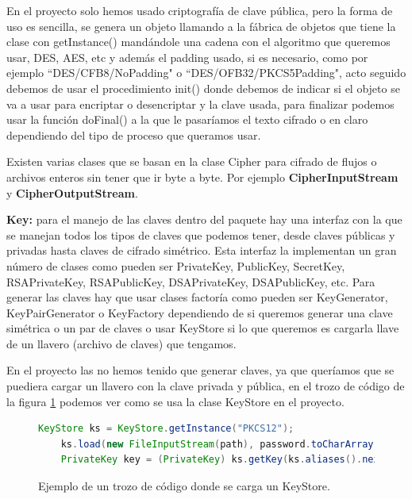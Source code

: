 En el proyecto solo hemos usado criptografía de clave pública, pero la forma de uso es sencilla, se genera un objeto llamando a la fábrica de objetos que tiene la clase con getInstance() mandándole una cadena con el algoritmo que queremos usar, DES, AES, etc y además el padding usado, si es necesario, como por ejemplo ``DES/CFB8/NoPadding" o ``DES/OFB32/PKCS5Padding", acto seguido debemos de usar el procedimiento init() donde debemos de indicar si el objeto se va a usar para encriptar o desencriptar y la clave usada, para finalizar podemos usar la función doFinal() a la que le pasaríamos el texto cifrado o en claro dependiendo del tipo de proceso que queramos usar.

Existen varias clases que se basan en la clase Cipher para cifrado de flujos o archivos enteros sin tener que ir byte a byte. Por ejemplo \textbf{CipherInputStream} y \textbf{CipherOutputStream}. 

\textbf{Key:} para el manejo de las claves dentro del paquete hay una interfaz con la que se manejan todos los tipos de claves que podemos tener, desde claves públicas y privadas hasta claves de cifrado simétrico. Esta interfaz la implementan un gran número de clases como pueden ser     PrivateKey, PublicKey, SecretKey, RSAPrivateKey, RSAPublicKey, DSAPrivateKey, DSAPublicKey, etc. Para generar las claves hay que usar clases factoría como pueden ser KeyGenerator, KeyPairGenerator o KeyFactory dependiendo de si queremos generar una clave simétrica o un par de claves o usar KeyStore si lo que queremos es cargarla llave de un llavero (archivo de claves) que tengamos.

En el proyecto las no hemos tenido que generar claves, ya que queríamos que se puediera cargar un llavero con la clave privada y pública, en el trozo de código de la figura \ref{cod:keyStore} podemos ver como se usa la clase KeyStore en el proyecto.

\begin{figure}

	\begin{scriptsize}
	\begin{lstlisting}[language=Java] 
	KeyStore ks = KeyStore.getInstance("PKCS12");
	ks.load(new FileInputStream(path), password.toCharArray());
	PrivateKey key = (PrivateKey) ks.getKey(ks.aliases().nextElement(), password.toCharArray());
	\end{lstlisting}
	\end{scriptsize}
		\caption{Ejemplo de un trozo de código donde se carga un KeyStore.}
		\label{cod:keyStore}
\end{figure}

